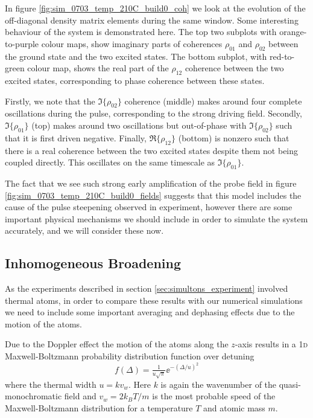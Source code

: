     In figure \ref{fig:sim_0703_temp_210C_build0_coh} we look at the evolution
    of the off-diagonal density matrix elements during the same window. Some
    interesting behaviour of the system is demonstrated here. The top two
    subplots with orange-to-purple colour maps, show imaginary parts of
    coherences $\rho_{01}$ and $\rho_{02}$ between the ground state and the two
    excited states. The bottom subplot, with red-to-green colour map, shows the
    real part of the $\rho_{12}$ coherence between the two excited states,
    corresponding to phase coherence between these states.

    Firstly, we note that the $\Im\{\rho_{02}\}$ coherence (middle) makes around
    four complete oscillations during the pulse, corresponding to the strong
    driving field. Secondly, $\Im\{\rho_{01}\}$ (top) makes around two
    oscillations but out-of-phase with $\Im\{\rho_{02}\}$ such that it is first
    driven negative. Finally, $\Re\{\rho_{12}\}$ (bottom) is nonzero such that
    there is a real coherence between the two excited states despite them not
    being coupled directly. This oscillates on the same timescale as
    $\Im\{\rho_{01}\}$.

    The fact that we see such strong early amplification of the probe field in
    figure \ref{fig:sim_0703_temp_210C_build0_fields} suggests that this model
    includes the cause of the pulse steepening observed in experiment, however
    there are some important physical mechanisms we should include in order to
    simulate the system accurately, and we will consider these now.

  \subsection{Inhomogeneous Broadening}

    As the experiments described in section \ref{sec:simultons_experiment}
    involved thermal atoms, in order to compare these results with our numerical
    simulations we need to include some important averaging and dephasing
    effects due to the motion of the atoms.

    Due to the Doppler effect the motion of the atoms along
    the $z$-axis results in a \textsc{1d} Maxwell-Boltzmann probability
    distribution function over detuning\cite{foot2005atomic, Gea-Banacloche1995}
    \begin{equation}\label{eqn:max_boltz}
      f(\Delta) = \tfrac{1}{u \sqrt{\pi}} \ee^{-(\Delta/u)^2}
    \end{equation}
    where the thermal width $u = k v_w$. Here $k$ is again the wavenumber of the quasi-monochromatic field and $v_w = 2 k_B T/m$ is the most probable speed of the Maxwell-Boltzmann distribution for a temperature $T$ and atomic mass $m$.
    \cite{schroeder2000introduction}


